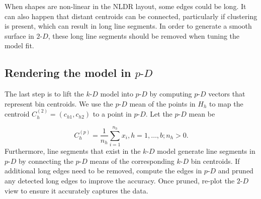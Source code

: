 \documentclass[
  12pt]{article}
\newcommand\pD{$p\text{-}D$}
\newcommand\kD{$k\text{-}D$}
\newcommand\gD{$2\text{-}D$}
\begin{document}
When shapes are non-linear in the NLDR layout, some edges could be long.
It can also happen that distant centroids can be connected, particularly
if clustering is present, which can result in long line segments. In
order to generate a smooth surface in \gD{}, these long line segments
should be removed when tuning the model fit.

\subsection{\texorpdfstring{Rendering the model in
\pD{}}{Rendering the model in }}\label{rendering-the-model-in}

The last step is to lift the \kD{} model into \pD{} by computing \pD{}
vectors that represent bin centroids. We use the \pD{} mean of the
points in \(H_h\) to map the centroid \(C_{h}^{(2)} = (c_{h1}, c_{h2})\)
to a point in \pD{}. Let the \pD{} mean be

\[C_{h}^{(p)} = \frac{1}{n_h}\sum_{i =1}^{n_h} x_i, h = {1, \dots, b; n_h > 0}.\]
Furthermore, line segments that exist in the \kD{} model generate line
segments in \pD{} by connecting the \pD{} means of the corresponding
\kD{} bin centroids. If additional long edges need to be removed,
compute the edges in \pD{} and pruned any detected long edges to improve
the accuracy. Once pruned, re-plot the \gD{} view to ensure it
accurately captures the data.
\end{document}
